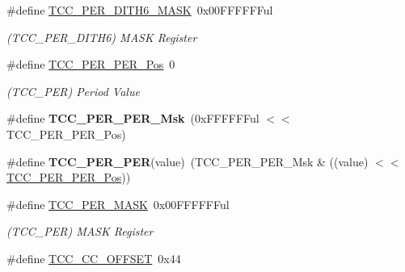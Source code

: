 \begin{DoxyCompactItemize}
\item 
\hypertarget{group___s_a_m_l21___t_c_c_ga21c55f5a31141c6160b20b42a1cb9424}{}\#define \hyperlink{group___s_a_m_l21___t_c_c_ga21c55f5a31141c6160b20b42a1cb9424}{T\+C\+C\+\_\+\+P\+E\+R\+\_\+\+D\+I\+T\+H6\+\_\+\+M\+A\+S\+K}~0x00\+F\+F\+F\+F\+F\+Ful\label{group___s_a_m_l21___t_c_c_ga21c55f5a31141c6160b20b42a1cb9424}

\begin{DoxyCompactList}\small\item\em (T\+C\+C\+\_\+\+P\+E\+R\+\_\+\+D\+I\+T\+H6) M\+A\+S\+K Register \end{DoxyCompactList}\item 
\hypertarget{group___s_a_m_l21___t_c_c_ga577f0797302e4a66331eddbe5408244a}{}\#define \hyperlink{group___s_a_m_l21___t_c_c_ga577f0797302e4a66331eddbe5408244a}{T\+C\+C\+\_\+\+P\+E\+R\+\_\+\+P\+E\+R\+\_\+\+Pos}~0\label{group___s_a_m_l21___t_c_c_ga577f0797302e4a66331eddbe5408244a}

\begin{DoxyCompactList}\small\item\em (T\+C\+C\+\_\+\+P\+E\+R) Period Value \end{DoxyCompactList}\item 
\hypertarget{group___s_a_m_l21___t_c_c_gae34afbd156c9717199cbecbb6593648f}{}\#define {\bfseries T\+C\+C\+\_\+\+P\+E\+R\+\_\+\+P\+E\+R\+\_\+\+Msk}~(0x\+F\+F\+F\+F\+F\+Ful $<$$<$ T\+C\+C\+\_\+\+P\+E\+R\+\_\+\+P\+E\+R\+\_\+\+Pos)\label{group___s_a_m_l21___t_c_c_gae34afbd156c9717199cbecbb6593648f}

\item 
\hypertarget{group___s_a_m_l21___t_c_c_gad97d34dc364bdbe0d7ed7d9c70a35d64}{}\#define {\bfseries T\+C\+C\+\_\+\+P\+E\+R\+\_\+\+P\+E\+R}(value)~(T\+C\+C\+\_\+\+P\+E\+R\+\_\+\+P\+E\+R\+\_\+\+Msk \& ((value) $<$$<$ \hyperlink{group___s_a_m_l21___t_c_c_ga577f0797302e4a66331eddbe5408244a}{T\+C\+C\+\_\+\+P\+E\+R\+\_\+\+P\+E\+R\+\_\+\+Pos}))\label{group___s_a_m_l21___t_c_c_gad97d34dc364bdbe0d7ed7d9c70a35d64}

\item 
\hypertarget{group___s_a_m_l21___t_c_c_ga56518654d7f0ae57dc1d24febfa5a2e5}{}\#define \hyperlink{group___s_a_m_l21___t_c_c_ga56518654d7f0ae57dc1d24febfa5a2e5}{T\+C\+C\+\_\+\+P\+E\+R\+\_\+\+M\+A\+S\+K}~0x00\+F\+F\+F\+F\+F\+Ful\label{group___s_a_m_l21___t_c_c_ga56518654d7f0ae57dc1d24febfa5a2e5}

\begin{DoxyCompactList}\small\item\em (T\+C\+C\+\_\+\+P\+E\+R) M\+A\+S\+K Register \end{DoxyCompactList}\item 
\hypertarget{group___s_a_m_l21___t_c_c_ga448a0c143d2619257ca0e5d96137295d}{}\#define \hyperlink{group___s_a_m_l21___t_c_c_ga448a0c143d2619257ca0e5d96137295d}{T\+C\+C\+\_\+\+C\+C\+\_\+\+O\+F\+F\+S\+E\+T}~0x44\label{group___s_a_m_l21___t_c_c_ga448a0c143d2619257ca0e5d96137295d}


\end{DoxyCompactItemize}
